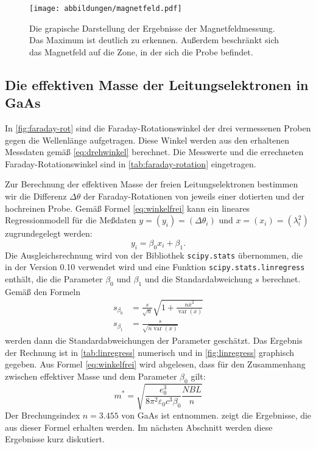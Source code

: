 \begin{figure}
  \centering
  \texttt{[image: abbildungen/magnetfeld.pdf]}
  \caption{Die grapische Darstellung der Ergebnisse der
    Magnetfeldmessung.  Das Maximum ist deutlich zu erkennen.  Außerdem
    beschränkt sich das Magnetfeld auf die Zone, in der sich die Probe
    befindet.}
  \label{fig:magnetfeld}
\end{figure}
\FloatBarrier
\subsection{Die effektiven Masse der Leitungselektronen in GaAs}

In \cref{fig:faraday-rot} sind die Faraday-Rotationswinkel der 
drei vermessenen Proben gegen die Wellenlänge aufgetragen. 
Diese Winkel werden aus den erhaltenen 
Messdaten gemäß \cref{eq:drehwinkel} berechnet. Die Messwerte und 
die errechneten Faraday-Rotationswinkel sind in 
\cref{tab:faraday-rotation} eingetragen.

Zur Berechnung der effektiven Masse der freien Leitungselektronen
bestimmen wir die Differenz $\Delta\theta$ der Faraday-Rotationen von
jeweils einer dotierten und der hochreinen Probe.  Gemäß Formel
\eqref{eq:winkelfrei} kann ein lineares Regressionmodell für die
Meßdaten $y = (y_i) = (\Delta\theta_i)$ und $x = (x_i) = (\lambda_i^2)$
zugrundegelegt werden:
%
\begin{equation}
  \label{eq:linregress}
  y_i = \beta_0 x_i + \beta_1.
\end{equation}
Die Ausgleichsrechnung wird von der Bibliothek \texttt{scipy.stats}
übernommen, die in der Version 0.10 verwendet wird und eine Funktion
\texttt{scipy.stats.linregress} enthält, die die Parameter $\beta_0$ und
$\beta_1$ und die Standardabweichung $s$ berechnet.  Gemäß den Formeln
%
\begin{align}
  \label{eq:stat-formeln}
  s_{\beta_0} &= \frac{s}{\sqrt{n}} \sqrt{1 + \frac{n\bar{x}^2}
    {\operatorname{var}(x)}}\\
  s_{\beta_1} &= \frac{s}{\sqrt{n \operatorname{var}(x)}}
\end{align}
%
werden dann die Standardabweichungen der Parameter geschätzt.  Das
Ergebnis der Rechnung ist in \cref{tab:linregress} numerisch und in
\cref{fig:linregress} graphisch gegeben.  Aus Formel
\eqref{eq:winkelfrei} wird abgelesen, dass für den Zusammenhang zwischen
effektiver Masse und dem Parameter $\beta_0$ gilt:
%
\begin{equation}
m^{*} = \sqrt{\frac{e_0^3}{8\pi^2\varepsilon_0c^3\beta_0} \frac{NBL}{n}}
\label{eq:effekt}
\end{equation}
%
Der Brechungsindex $n = \num{3.455}$ von GaAs ist \cite{filmetrics}
entnommen.  zeigt die Ergebnisse, die aus dieser
Formel erhalten werden.  Im nächsten Abschnitt werden diese Ergebnisse
kurz diskutiert.

